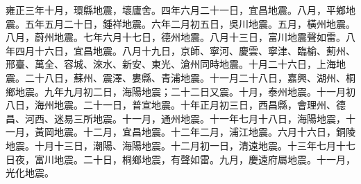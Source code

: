 \begin{pinyinscope}
雍正三年十月，環縣地震，壞廬舍。四年六月二十一日，宜昌地震。八月，平鄉地震。五年五月二十日，鍾祥地震。六年二月初五日，吳川地震。五月，橫州地震。八月，蔚州地震。七年六月十七日，德州地震。八月十三日，富川地震聲如雷。八年四月十六日，宜昌地震。八月十九日，京師、寧河、慶雲、寧津、臨榆、薊州、邢臺、萬全、容城、淶水、新安、東光、滄州同時地震。十月二十六日，上海地震。二十八日，蘇州、震澤、婁縣、青浦地震。十一月二十八日，嘉興、湖州、桐鄉地震。九年九月初二日，海陽地震；二十二日又震。十月，泰州地震。十一月初八日，海州地震。二十一日，普宣地震。十年正月初三日，西昌縣，會理州、德昌、河西、迷易三所地震。十一月，通州地震。十一年七月十八日，海陽地震，十一月，黃岡地震。十二月，宜昌地震。十二年二月，浦江地震。六月十六日，銅陵地震。十月十三日，潮陽、海陽地震。十二月初一日，清遠地震。十三年七月十七日夜，富川地震。二十日，桐鄉地震，有聲如雷。九月，慶遠府屬地震。十一月，光化地震。


\end{pinyinscope}
